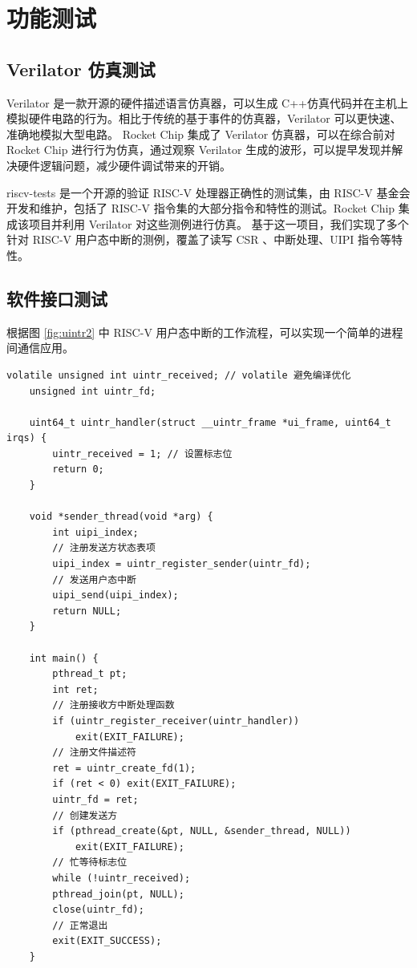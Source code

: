 \section{功能测试}

\subsection{Verilator 仿真测试}

Verilator \cite{verilator} 是一款开源的硬件描述语言仿真器，可以生成 C++仿真代码并在主机上模拟硬件电路的行为。相比于传统的基于事件的仿真器，Verilator 可以更快速、准确地模拟大型电路。
Rocket Chip 集成了 Verilator 仿真器，可以在综合前对 Rocket Chip 进行行为仿真，通过观察 Verilator 生成的波形，可以提早发现并解决硬件逻辑问题，减少硬件调试带来的开销。

riscv-tests \cite{riscvtests} 是一个开源的验证 RISC-V 处理器正确性的测试集，由 RISC-V 基金会开发和维护，包括了 RISC-V 指令集的大部分指令和特性的测试。Rocket Chip 集成该项目并利用 Verilator 对这些测例进行仿真。
基于这一项目，我们实现了多个针对 RISC-V 用户态中断的测例，覆盖了读写 CSR 、中断处理、UIPI 指令等特性。

\subsection{软件接口测试}

根据图 \ref{fig:uintr2} 中 RISC-V 用户态中断的工作流程，可以实现一个简单的进程间通信应用。

\begin{lstlisting}[style=CStyle]
    volatile unsigned int uintr_received; // volatile 避免编译优化
    unsigned int uintr_fd;

    uint64_t uintr_handler(struct __uintr_frame *ui_frame, uint64_t irqs) {
        uintr_received = 1; // 设置标志位
        return 0;
    }

    void *sender_thread(void *arg) {
        int uipi_index;
        // 注册发送方状态表项
        uipi_index = uintr_register_sender(uintr_fd);
        // 发送用户态中断
        uipi_send(uipi_index);
        return NULL;
    }

    int main() {
        pthread_t pt;
        int ret;
        // 注册接收方中断处理函数
        if (uintr_register_receiver(uintr_handler))
            exit(EXIT_FAILURE);
        // 注册文件描述符
        ret = uintr_create_fd(1);
        if (ret < 0) exit(EXIT_FAILURE);
        uintr_fd = ret;
        // 创建发送方
        if (pthread_create(&pt, NULL, &sender_thread, NULL))
            exit(EXIT_FAILURE);
        // 忙等待标志位
        while (!uintr_received);
        pthread_join(pt, NULL);
        close(uintr_fd);
        // 正常退出
        exit(EXIT_SUCCESS);
    }
\end{lstlisting}

